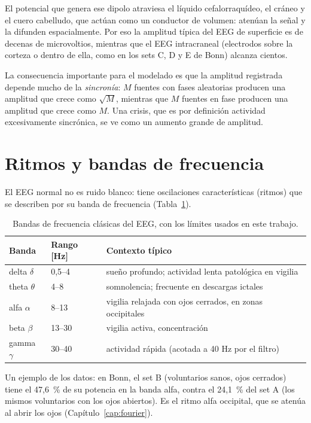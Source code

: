 El potencial que genera ese dipolo atraviesa el líquido cefalorraquídeo, el cráneo y el cuero
cabelludo, que actúan como un conductor de volumen: atenúan la señal y la difunden espacialmente.
Por eso la amplitud típica del EEG de superficie es de decenas de microvoltios, mientras que el EEG
intracraneal (electrodos sobre la corteza o dentro de ella, como en los sets C, D y E de Bonn) alcanza
cientos.

La consecuencia importante para el modelado es que la amplitud registrada depende mucho de la
\emph{sincronía}: $M$ fuentes con fases aleatorias producen una amplitud que crece como $\sqrt{M}$,
mientras que $M$ fuentes en fase producen una amplitud que crece como $M$. Una crisis, que es por
definición actividad excesivamente sincrónica, se ve como un aumento grande de amplitud.

\section{Ritmos y bandas de frecuencia}

El EEG normal no es ruido blanco: tiene oscilaciones características (ritmos) que se describen por su
banda de frecuencia (Tabla~\ref{tab:bandas}).

\begin{table}[ht]
\centering
\caption{Bandas de frecuencia clásicas del EEG, con los límites usados en este trabajo.}
\label{tab:bandas}
\begin{tabular}{llp{8cm}}
\toprule
Banda & Rango [Hz] & Contexto típico \\
\midrule
delta $\delta$ & 0,5--4 & sueño profundo; actividad lenta patológica en vigilia \\
theta $\theta$ & 4--8 & somnolencia; frecuente en descargas ictales \\
alfa $\alpha$ & 8--13 & vigilia relajada con ojos cerrados, en zonas occipitales \\
beta $\beta$ & 13--30 & vigilia activa, concentración \\
gamma $\gamma$ & 30--40 & actividad rápida (acotada a 40 Hz por el filtro) \\
\bottomrule
\end{tabular}
\end{table}

Un ejemplo de los datos: en Bonn, el set B (voluntarios sanos, ojos cerrados) tiene el 47,6~\% de su
potencia en la banda alfa, contra el 24,1~\% del set A (los mismos voluntarios con los ojos abiertos).
Es el ritmo alfa occipital, que se atenúa al abrir los ojos (Capítulo~\ref{cap:fourier}).

